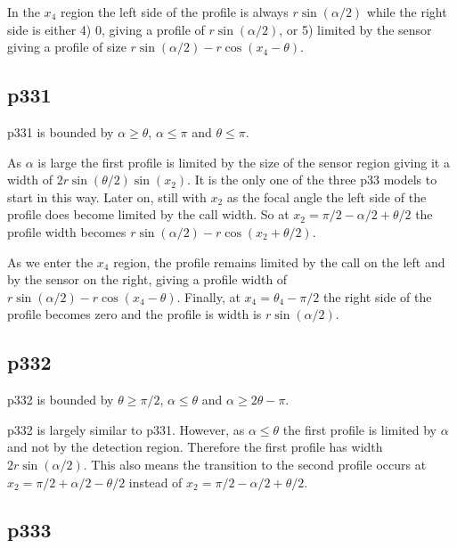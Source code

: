 In the $x_4$ region the left side of the profile is always $r\sin(\alpha /2)$ while the right side is either 4) 0, giving a profile of $r\sin(\alpha /2)$, or 5) limited by the sensor giving a profile of size $r\sin (\alpha /2) -r\cos(x_4-\theta) $.

\subsection{p331} \label{p331}

p331 is bounded by $\alpha \ge \theta$, $\alpha \le\pi$ and $\theta \le \pi$.

As $\alpha $ is large the first profile is limited by the size of the sensor region giving it a width of $2r\sin\left(\theta/2\right)\sin(x_2)$. It is the only one of the three p33 models to start in this way. Later on, still with $x_2$ as the focal angle the left side of the profile does become limited by the call width. So at $x_2= \pi/2 - \alpha/2 + \theta/2$ the profile width becomes $r\sin(\alpha/2) - r\cos(x_2 + \theta/2)$. 

As we enter the $x_4$ region, the profile remains limited by the call on the left and by the sensor on the right, giving a profile width of  $r\sin (\alpha /2) -r\cos(x_4-\theta) $. Finally, at $x_4 = \theta_4 - \pi/2$ the right side of the profile becomes zero and the profile is width is $r\sin(\alpha /2)$.



\subsection{p332} \label{p332}

p332 is bounded by $\theta \ge \pi/2$, $\alpha \le \theta$ and $\alpha \ge 2\theta -\pi$.

p332 is largely similar to p331. However, as $\alpha \le \theta$ the first profile is limited by $\alpha$ and not by the detection region. Therefore the first profile has width $2r\sin(\alpha /2)$. This also means the transition to the second profile occurs at  $x_2 = \pi/2 + \alpha/2 - \theta/2$ instead of  $x_2 = \pi/2 - \alpha/2 + \theta/2$.





\subsection{p333} \label{p333}


